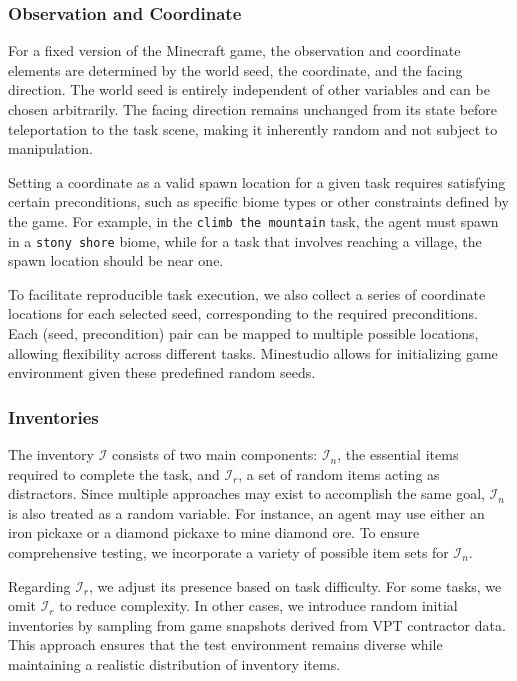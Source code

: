 \subsubsection{Observation and Coordinate}

For a fixed version of the Minecraft game, the observation and coordinate elements are determined by the world seed, the coordinate, and the facing direction. The world seed is entirely independent of other variables and can be chosen arbitrarily. The facing direction remains unchanged from its state before teleportation to the task scene, making it inherently random and not subject to manipulation.

Setting a coordinate as a valid spawn location for a given task requires satisfying certain preconditions, such as specific biome types or other constraints defined by the game. For example, in the \texttt{climb the mountain} task, the agent must spawn in a \texttt{stony shore} biome, while for a task that involves reaching a village, the spawn location should be near one.

To facilitate reproducible task execution, we also collect a series of coordinate locations for each selected seed, corresponding to the required preconditions. Each (seed, precondition) pair can be mapped to multiple possible locations, allowing flexibility across different tasks. Minestudio allows for initializing game environment given these predefined random seeds.

\subsubsection{Inventories}

The inventory $\mathcal{I}$ consists of two main components: $\mathcal{I}_n$, the essential items required to complete the task, and $\mathcal{I}_r$, a set of random items acting as distractors. Since multiple approaches may exist to accomplish the same goal, $\mathcal{I}_n$ is also treated as a random variable. For instance, an agent may use either an iron pickaxe or a diamond pickaxe to mine diamond ore. To ensure comprehensive testing, we incorporate a variety of possible item sets for $\mathcal{I}_n$.

Regarding $\mathcal{I}_r$, we adjust its presence based on task difficulty. For some tasks, we omit $\mathcal{I}_r$ to reduce complexity. In other cases, we introduce random initial inventories by sampling from game snapshots derived from VPT contractor data. This approach ensures that the test environment remains diverse while maintaining a realistic distribution of inventory items.

